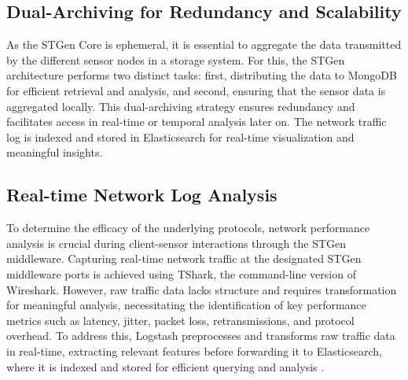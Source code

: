 \documentclass[jsan,article,submit,moreauthors,pdftex]{Definitions/mdpi}
\begin{document}
\subsection{Dual-Archiving for Redundancy and Scalability}
\label{sub:dual_archiving}
As the STGen Core is ephemeral, it is essential to aggregate the data transmitted by the different sensor nodes in a storage system. For this, the STGen architecture performs two distinct tasks: first, distributing the data to MongoDB for efficient retrieval and analysis, and second, ensuring that the sensor data is aggregated locally. This dual-archiving strategy ensures redundancy and facilitates access in real-time or temporal analysis later on. The network traffic log is indexed and stored in Elasticsearch for real-time visualization and meaningful insights.


\subsection{Real-time Network Log Analysis}
\label{sub_realtime_net}
To determine the efficacy of the underlying protocols, network performance analysis is crucial during client-sensor interactions through the STGen middleware. Capturing real-time network traffic at the designated STGen middleware ports is achieved using TShark, the command-line version of Wireshark. However, raw traffic data lacks structure and requires transformation for meaningful analysis, necessitating the identification of key performance metrics such as latency, jitter, packet loss, retransmissions, and protocol overhead. To address this, Logstash preprocesses and transforms raw traffic data in real-time, extracting relevant features before forwarding it to Elasticsearch, where it is indexed and stored for efficient querying and analysis \cite{elastic_kibana_visualizations}.



\end{document}
